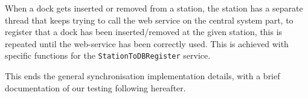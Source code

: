 \begin{description}[style=nextline]
	\item[Dock insertion/removal]
	When a dock gets inserted or removed from a station, the station has a separate thread that keeps trying to call the web service on the central system part, to register that a dock has been inserted/removed at the given station, this is repeated until the web-service has been correctly used.
	This is achieved with specific functions for the \texttt{StationToDBRegister} service.
	
\end{description}

This ends the general synchronisation implementation details, with a brief documentation of our testing following hereafter.
